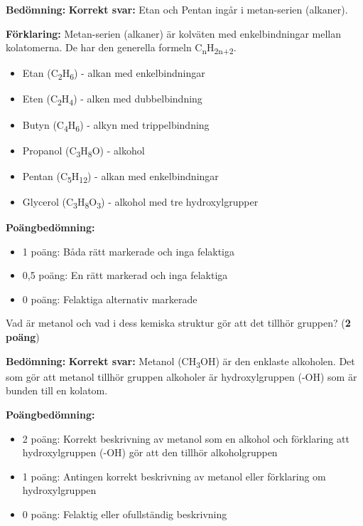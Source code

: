 \documentclass[12pt]{exam}
\newenvironment{answer}
  {\begin{framed}\color{blue}\textbf{Bedömning:} }
  {\end{framed}}
\begin{document}
\begin{questions}
\begin{answer}
\textbf{Korrekt svar:} Etan och Pentan ingår i metan-serien (alkaner).

\textbf{Förklaring:} Metan-serien (alkaner) är kolväten med enkelbindningar mellan kolatomerna. De har den generella formeln C\textsubscript{n}H\textsubscript{2n+2}.
\begin{itemize}
  \item Etan (C\textsubscript{2}H\textsubscript{6}) - alkan med enkelbindningar
  \item Eten (C\textsubscript{2}H\textsubscript{4}) - alken med dubbelbindning
  \item Butyn (C\textsubscript{4}H\textsubscript{6}) - alkyn med trippelbindning
  \item Propanol (C\textsubscript{3}H\textsubscript{8}O) - alkohol
  \item Pentan (C\textsubscript{5}H\textsubscript{12}) - alkan med enkelbindningar
  \item Glycerol (C\textsubscript{3}H\textsubscript{8}O\textsubscript{3}) - alkohol med tre hydroxylgrupper
\end{itemize}

\textbf{Poängbedömning:}
\begin{itemize}
  \item 1 poäng: Båda rätt markerade och inga felaktiga
  \item 0,5 poäng: En rätt markerad och inga felaktiga
  \item 0 poäng: Felaktiga alternativ markerade
\end{itemize}
\end{answer}
\vspace{5mm}

\question Vad är metanol och vad i dess kemiska struktur gör att det tillhör gruppen? (\textbf{2 poäng})
\vspace{5mm}

\begin{answer}
\textbf{Korrekt svar:} Metanol (CH\textsubscript{3}OH) är den enklaste alkoholen. Det som gör att metanol tillhör gruppen alkoholer är hydroxylgruppen (-OH) som är bunden till en kolatom.

\textbf{Poängbedömning:}
\begin{itemize}
  \item 2 poäng: Korrekt beskrivning av metanol som en alkohol och förklaring att hydroxylgruppen (-OH) gör att den tillhör alkoholgruppen
  \item 1 poäng: Antingen korrekt beskrivning av metanol eller förklaring om hydroxylgruppen
  \item 0 poäng: Felaktig eller ofullständig beskrivning
\end{itemize}
\end{answer}
\vspace{5mm}


\end{questions}
\end{document}
